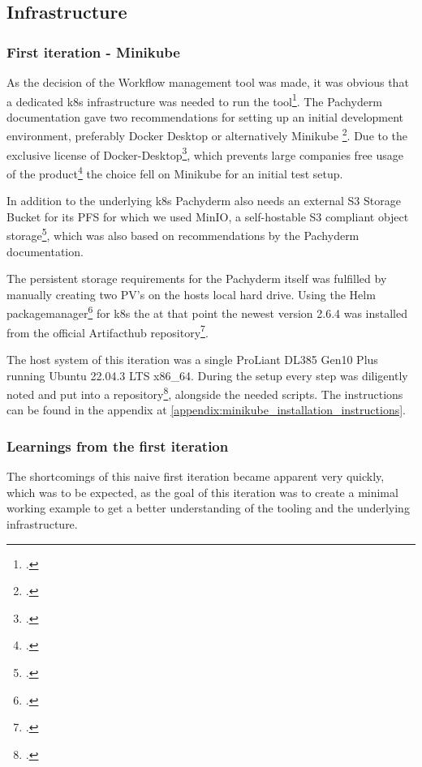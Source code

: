 
\subsection{Infrastructure}


\subsubsection{First iteration - Minikube}
\label{minikube}
As the decision of the Workflow management tool was made, it was obvious that a dedicated \ac{k8s} infrastructure was needed to run the tool\footcite{PachydermDocsOnPrem}.
The Pachyderm documentation gave two recommendations for setting up an initial development environment, preferably Docker Desktop or alternatively Minikube \footcite{PachydermDocsLocal}.
Due to the exclusive license of Docker-Desktop\footcite{DockerTermsService2022},
which prevents large companies free usage of the product\footcite{DockerFAQsDocker2021} the choice fell on Minikube for an initial test setup.

In addition to the underlying \ac{k8s} Pachyderm also needs an external S3 Storage Bucket for its \ac{PFS} for which we used MinIO,
a self-hostable S3 compliant object storage\footcite{incMinIOMinIOKubernetes}, which was also based on recommendations by the Pachyderm documentation.

The persistent storage requirements for the Pachyderm itself was fulfilled by manually creating two \ac{PV}'s on the hosts local hard drive.
Using the Helm packagemanager\footcite{HelmDocsHome} for \ac{k8s} the at that point the newest version 2.6.4 was installed from the official Artifacthub repository\footcite{ArtifacthubPachyderm}.

The host system of this iteration was a single ProLiant DL385 Gen10 Plus running Ubuntu 22.04.3 LTS x86\_64.
During the setup every step was diligently noted and put into a repository\footcite{eckerthInstallationInstructionsMinikube}, alongside the needed scripts. 
The instructions can be found in the appendix at \ref{appendix:minikube_installation_instructions}.


\subsubsection*{Learnings from the first iteration}

The shortcomings of this naive first iteration became apparent very quickly, 
which was to be expected, as the goal of this iteration was to create a minimal working example to get a better understanding of the tooling and the underlying infrastructure.

